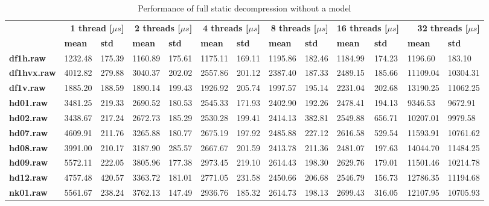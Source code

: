 \begin{table}
\centering
\small
\begin{tabular}{l|ll|ll|ll|ll|ll|ll}
    & \multicolumn{2}{r|}{\textbf{1 thread [$\mu s$]}} & \multicolumn{2}{r|}{\textbf{2 threads [$\mu s$]}} & \multicolumn{2}{r|}{\textbf{4 threads [$\mu s$]}} & \multicolumn{2}{r|}{\textbf{8 threads [$\mu s$]}} & \multicolumn{2}{r|}{\textbf{16 threads [$\mu s$]}} & \multicolumn{2}{r}{\textbf{32 threads [$\mu s$]}} \\
    & \textbf{mean} & \textbf{std} & \textbf{mean} & \textbf{std} & \textbf{mean} & \textbf{std} & \textbf{mean} & \textbf{std} & \textbf{mean} & \textbf{std} & \textbf{mean} & \textbf{std} \\
\hline
    \textbf{df1h.raw} & 1232.48 & 175.39 & 1160.89 & 175.61 & 1175.11 & 169.11 & 1195.86 & 182.46 & 1184.99 & 174.23 & 1196.60 & 183.10 \\
    \textbf{df1hvx.raw} & 4012.82 & 279.88 & 3040.37 & 202.02 & 2557.86 & 201.12 & 2387.40 & 187.33 & 2489.15 & 185.66 & 11109.04 & 10304.31 \\
    \textbf{df1v.raw} & 1885.20 & 188.59 & 1890.14 & 199.43 & 1926.92 & 205.74 & 1997.57 & 195.14 & 2231.04 & 202.68 & 13190.25 & 11062.25 \\
    \textbf{hd01.raw} & 3481.25 & 219.33 & 2690.52 & 180.53 & 2545.33 & 171.93 & 2402.90 & 192.26 & 2478.41 & 194.13 & 9346.53 & 9672.91 \\
    \textbf{hd02.raw} & 3438.67 & 217.24 & 2672.73 & 185.29 & 2530.28 & 199.41 & 2414.13 & 382.81 & 2549.88 & 656.71 & 10207.01 & 9979.58 \\
    \textbf{hd07.raw} & 4609.91 & 211.76 & 3265.88 & 180.77 & 2675.19 & 197.92 & 2485.88 & 227.12 & 2616.58 & 529.54 & 11593.91 & 10761.62 \\
    \textbf{hd08.raw} & 3991.00 & 210.17 & 3187.90 & 285.57 & 2667.67 & 201.59 & 2413.78 & 211.36 & 2481.07 & 197.63 & 14044.70 & 11484.25 \\
    \textbf{hd09.raw} & 5572.11 & 222.05 & 3805.96 & 177.38 & 2973.45 & 219.10 & 2614.43 & 198.30 & 2629.76 & 179.01 & 11501.46 & 10214.78 \\
    \textbf{hd12.raw} & 4757.48 & 420.57 & 3363.72 & 181.01 & 2771.05 & 231.58 & 2450.66 & 206.68 & 2546.79 & 156.73 & 12786.35 & 11194.68 \\
    \textbf{nk01.raw} & 5561.67 & 238.24 & 3762.13 & 147.49 & 2936.76 & 185.32 & 2614.73 & 198.13 & 2699.43 & 316.05 & 12107.95 & 10705.93 \\
\end{tabular}
\caption{Performance of full static decompression without a model}
\end{table}
